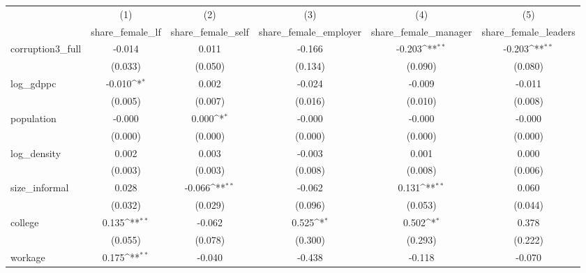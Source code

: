 {
\def\sym#1{\ifmmode^{#1}\else\(^{#1}\)\fi}
\begin{tabular}{l*{5}{c}}
\hline\hline
            &\multicolumn{1}{c}{(1)}&\multicolumn{1}{c}{(2)}&\multicolumn{1}{c}{(3)}&\multicolumn{1}{c}{(4)}&\multicolumn{1}{c}{(5)}\\
            &\multicolumn{1}{c}{share\_female\_lf}&\multicolumn{1}{c}{share\_female\_self}&\multicolumn{1}{c}{share\_female\_employer}&\multicolumn{1}{c}{share\_female\_manager}&\multicolumn{1}{c}{share\_female\_leaders}\\
\hline
corruption3\_full&      -0.014         &       0.011         &      -0.166         &      -0.203\sym{**} &      -0.203\sym{**} \\
            &     (0.033)         &     (0.050)         &     (0.134)         &     (0.090)         &     (0.080)         \\
[1em]
log\_gdppc   &      -0.010\sym{*}  &       0.002         &      -0.024         &      -0.009         &      -0.011         \\
            &     (0.005)         &     (0.007)         &     (0.016)         &     (0.010)         &     (0.008)         \\
[1em]
population  &      -0.000         &       0.000\sym{*}  &      -0.000         &      -0.000         &      -0.000         \\
            &     (0.000)         &     (0.000)         &     (0.000)         &     (0.000)         &     (0.000)         \\
[1em]
log\_density &       0.002         &       0.003         &      -0.003         &       0.001         &       0.000         \\
            &     (0.003)         &     (0.003)         &     (0.008)         &     (0.008)         &     (0.006)         \\
[1em]
size\_informal&       0.028         &      -0.066\sym{**} &      -0.062         &       0.131\sym{**} &       0.060         \\
            &     (0.032)         &     (0.029)         &     (0.096)         &     (0.053)         &     (0.044)         \\
[1em]
college     &       0.135\sym{**} &      -0.062         &       0.525\sym{*}  &       0.502\sym{*}  &       0.378         \\
            &     (0.055)         &     (0.078)         &     (0.300)         &     (0.293)         &     (0.222)         \\
[1em]
workage     &       0.175\sym{**} &      -0.040         &      -0.438         &      -0.118         &      -0.070         \\

\end{tabular}}
